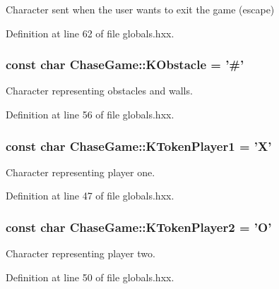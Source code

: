 Character sent when the user wants to exit the game (escape) 



Definition at line 62 of file globals.\-hxx.

\hypertarget{namespace_chase_game_ad86181b2050b912dab9d69d2f0bea76e}{
\subsubsection[{K\-Obstacle}]{\setlength{\rightskip}{0pt plus 5cm}const char Chase\-Game\-::\-K\-Obstacle = '\#'}}\label{namespace_chase_game_ad86181b2050b912dab9d69d2f0bea76e}


Character representing obstacles and walls. 



Definition at line 56 of file globals.\-hxx.

\hypertarget{namespace_chase_game_a8452e2d6de618e4ca7a9f76b082b52a4}{
\subsubsection[{K\-Token\-Player1}]{\setlength{\rightskip}{0pt plus 5cm}const char Chase\-Game\-::\-K\-Token\-Player1 = 'X'}}\label{namespace_chase_game_a8452e2d6de618e4ca7a9f76b082b52a4}


Character representing player one. 



Definition at line 47 of file globals.\-hxx.

\hypertarget{namespace_chase_game_ae27343407c21a8d6e3cf26b736bd5527}{
\subsubsection[{K\-Token\-Player2}]{\setlength{\rightskip}{0pt plus 5cm}const char Chase\-Game\-::\-K\-Token\-Player2 = 'O'}}\label{namespace_chase_game_ae27343407c21a8d6e3cf26b736bd5527}


Character representing player two. 



Definition at line 50 of file globals.\-hxx.

